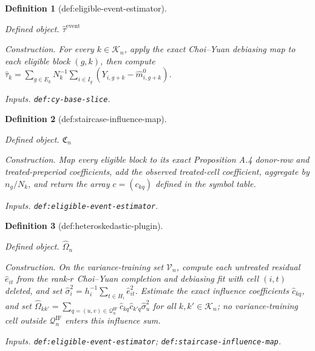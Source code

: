 \documentclass{article}
\newtheorem{definition}{Definition}
\begin{document}
\begin{definition}[def:eligible-event-estimator]\label{def:eligible-event-estimator}
\par\smallskip\noindent\emph{Defined object.} \(\widehat\tau^{\mathrm{event}}\)
\par\smallskip\noindent\emph{Construction.} For every \(k\in\mathcal K_n\), apply the exact Choi--Yuan debiasing map to each eligible block \((g,k)\), then compute \(\widehat\tau_k=\sum_{g\in E_k}N_k^{-1}\sum_{i\in I_g}(Y_{i,g+k}-\widehat m^0_{i,g+k})\).
\par\smallskip\noindent\emph{Inputs.} \texttt{def:\allowbreak{}cy-\allowbreak{}base-\allowbreak{}slice}.
\end{definition}

\begin{definition}[def:staircase-influence-map]\label{def:staircase-influence-map}
\par\smallskip\noindent\emph{Defined object.} \(\mathfrak C_n\)
\par\smallskip\noindent\emph{Construction.} Map every eligible block to its exact Proposition A.4 donor-row and treated-preperiod coefficients, add the observed treated-cell coefficient, aggregate by \(n_g/N_k\), and return the array \(c=(c_{kq})\) defined in the symbol table.
\par\smallskip\noindent\emph{Inputs.} \texttt{def:\allowbreak{}eligible-\allowbreak{}event-\allowbreak{}estimator}.
\end{definition}

\begin{definition}[def:heteroskedastic-plugin]\label{def:heteroskedastic-plugin}
\par\smallskip\noindent\emph{Defined object.} \(\widehat\Omega_n\)
\par\smallskip\noindent\emph{Construction.} On the variance-training set \(\mathcal V_n\), compute each untreated residual \(\widehat e_{it}\) from the rank-\(r\) Choi--Yuan completion and debiasing fit with cell \((i,t)\) deleted, and set \(\widehat\sigma_i^2=h_i^{-1}\sum_{t\in H_i}\widehat e_{it}^2\). Estimate the exact influence coefficients \(\widehat c_{kq}\), and set \(\widehat\Omega_{kk'}=\sum_{q=(u,v)\in\mathcal Q_n^{\mathrm{IF}}}\widehat c_{kq}\widehat c_{k'q}\widehat\sigma_u^2\) for all \(k,k'\in\mathcal K_n\); no variance-training cell outside \(\mathcal Q_n^{\mathrm{IF}}\) enters this influence sum.
\par\smallskip\noindent\emph{Inputs.} \texttt{def:\allowbreak{}eligible-\allowbreak{}event-\allowbreak{}estimator}; \texttt{def:\allowbreak{}staircase-\allowbreak{}influence-\allowbreak{}map}.
\end{definition}
\end{document}
